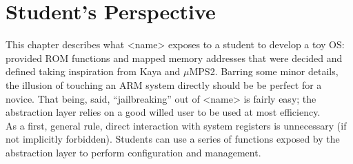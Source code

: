 \documentclass[12pt,a4paper,openright,twoside]{report}
\begin{document}
\chapter{Student's Perspective}
This chapter describes what <name> exposes to a student to develop a toy OS:
provided ROM functions and mapped memory addresses that were decided and defined
taking inspiration from Kaya and $\mu$MPS2.
Barring some minor details, the illusion of touching an ARM system directly should
be be perfect for a novice. That being, said, ``jailbreaking'' out of <name> is 
fairly easy; the abstraction layer relies on a good willed user to be used at 
most efficiency.\\
As a first, general rule, direct interaction with system registers is
unnecessary (if not implicitly forbidden). Students can use a series of functions
exposed by the abstraction layer to perform configuration and management.
\end{document}
